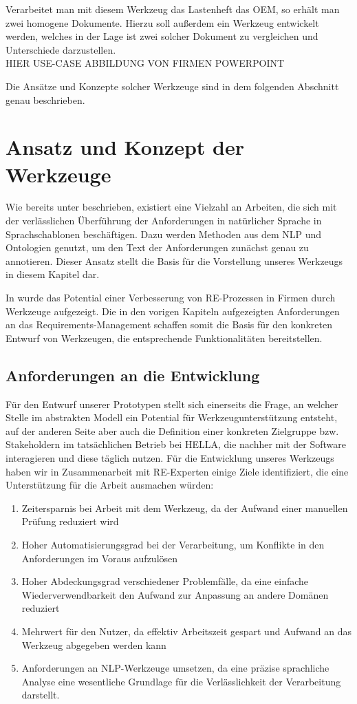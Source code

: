 \documentclass[12pt]{report}
\begin{document}
Verarbeitet man mit diesem Werkzeug das Lastenheft das OEM, so erhält man zwei homogene Dokumente. Hierzu soll außerdem ein Werkzeug entwickelt werden, welches in der Lage ist zwei solcher Dokument zu vergleichen und Unterschiede darzustellen.
\\ 
\newline
HIER USE-CASE ABBILDUNG VON FIRMEN POWERPOINT 
\\
\newline

Die Ansätze und Konzepte solcher Werkzeuge sind in dem folgenden Abschnitt genau beschrieben.

\section[Ansatz und Konzept]{Ansatz und Konzept der Werkzeuge}
Wie bereits unter beschrieben, existiert eine Vielzahl an Arbeiten, die sich mit der verlässlichen Überführung der Anforderungen in natürlicher Sprache in Sprachschablonen beschäftigen. Dazu werden Methoden aus dem NLP und Ontologien genutzt, um den Text der Anforderungen zunächst genau zu annotieren. Dieser Ansatz stellt die Basis für die Vorstellung unseres Werkzeugs in diesem Kapitel dar.

In \cite{zh17} wurde das Potential einer Verbesserung von RE-Prozessen in Firmen durch Werkzeuge aufgezeigt. Die in den vorigen Kapiteln aufgezeigten Anforderungen an das Requirements-Management schaffen somit die Basis für den konkreten Entwurf von Werkzeugen, die entsprechende Funktionalitäten bereitstellen.

\subsection{Anforderungen an die Entwicklung}
Für den Entwurf unserer Prototypen stellt sich einerseits die Frage, an welcher Stelle im abstrakten Modell ein Potential für Werkzeugunterstützung entsteht, auf der anderen Seite aber auch die Definition einer konkreten Zielgruppe bzw. Stakeholdern im tatsächlichen Betrieb bei HELLA, die nachher mit der Software interagieren und diese täglich nutzen.
Für die Entwicklung unseres Werkzeugs haben wir in Zusammenarbeit mit RE-Experten einige Ziele identifiziert, die eine Unterstützung für die Arbeit ausmachen würden:
\begin{enumerate}
\item Zeitersparnis bei Arbeit mit dem Werkzeug, da der Aufwand einer manuellen Prüfung reduziert wird
\item Hoher Automatisierungsgrad bei der Verarbeitung, um Konflikte in den Anforderungen im Voraus aufzulösen
\item Hoher Abdeckungsgrad verschiedener Problemfälle, da eine einfache Wiederverwendbarkeit den Aufwand zur Anpassung an andere Domänen reduziert
\item Mehrwert für den Nutzer, da effektiv Arbeitszeit gespart und Aufwand an das Werkzeug abgegeben werden kann
\item Anforderungen an NLP-Werkzeuge umsetzen, da eine präzise sprachliche Analyse eine wesentliche Grundlage für die Verlässlichkeit der Verarbeitung darstellt.
\end{enumerate}
\end{document}
